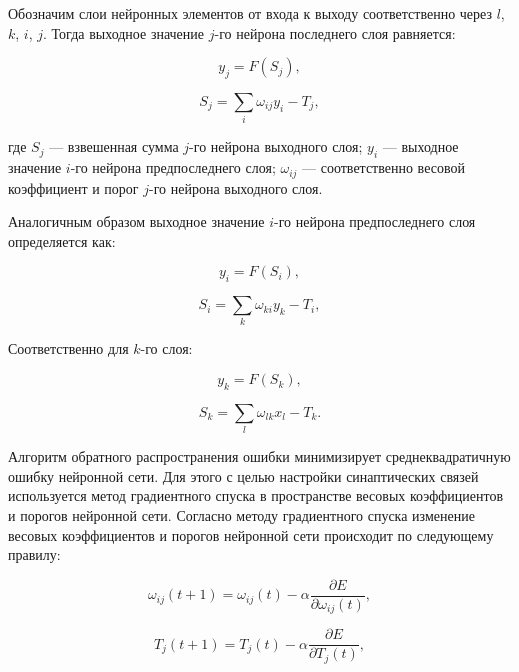 Обозначим слои нейронных элементов от входа к выходу соответственно через $l$, $k$, $i$, $j$. Тогда выходное значение $j$-го нейрона последнего слоя равняется:

\begin{equation}
    y_j = F(S_j),
\end{equation}

\begin{equation}
    S_j = \sum_{i}{\omega_{i j} y_i - T_j},
\end{equation}

где $S_j$ — взвешенная сумма $j$-го нейрона выходного слоя; $y_i$ — выходное
значение $i$-го нейрона предпоследнего слоя; $\omega_{i j}$ — соответственно весовой коэффициент и порог $j$-го нейрона выходного слоя.

Аналогичным образом выходное значение $i$-го нейрона предпоследнего слоя определяется как:

\begin{equation}
    y_i = F(S_i),
\end{equation}

\begin{equation}
    S_i = \sum_{k}{\omega_{k i} y_k - T_i},
\end{equation}

Соответственно для $k$-го слоя:

\begin{equation}
    y_k = F(S_k),
\end{equation}

\begin{equation}
    S_k = \sum_{l}{\omega_{l k} x_l - T_k}.
\end{equation}

Алгоритм обратного распространения ошибки минимизирует среднеквадратичную ошибку нейронной сети. Для этого с целью настройки синаптических связей используется метод градиентного спуска в пространстве весовых коэффициентов и порогов нейронной сети. Согласно методу градиентного спуска изменение весовых коэффициентов и порогов нейронной сети происходит по следующему правилу:

\begin{equation}
    \omega_{i j}(t + 1) = \omega_{i j}(t) - \alpha\frac{\partial E}{\partial\omega_{i j}(t)},
\end{equation}

\begin{equation}
    T_j(t + 1) = T_j(t) - \alpha\frac{\partial E}{\partial T_j(t)},
\end{equation}

